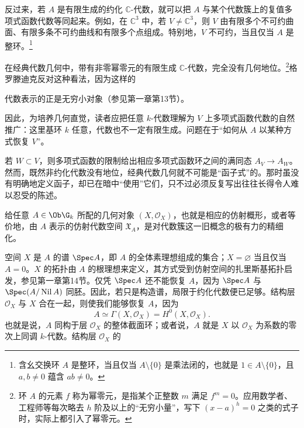 反过来，若 $A$ 是有限生成的约化 $\mathbb C$-代数，就可以把 $A$ 与某个代数簇上的复值多项式函数代数等同起来。例如，在 $\mathbb C^3$ 中，若 $V\ne\mathbb C^3$，则 $V$ 由有限多个不可约曲面、有限多条不可约曲线和有限多个点组成。特别地，$V$ 不可约，当且仅当 $A$ 是整环。\footnote{含幺交换环 $A$ 是整环，当且仅当 $A\setminus\{0\}$ 是乘法闭的，也就是 $1\in A\setminus\{0\}$，且 $a,b\ne0$ 蕴含 $ab\ne0$。}
\begin{center}
\end{center}
在经典代数几何中，带有非零幂零元的有限生成 $\mathbb C$-代数，完全没有几何地位。\footnote{环 $A$ 的元素 $f$ 称为幂零元，是指某个正整数 $m$ 满足 $f^m=0$。应用数学者、工程师等每次略去 $h$ 阶及以上的“无穷小量”，写下 $(x-a)^h=0$ 之类的式子时，实际上都引入了幂零元。}格罗滕迪克反对这种看法，因为这样的

代数表示的正是无穷小对象（参见第一章第13节）。

因此，为培养几何直觉，读者应把任意 $k$-代数理解为 $V$ 上多项式函数代数的自然推广：这里基环 $k$ 任意，代数也不一定有限生成。问题在于“如何从 $A$ 以某种方式恢复 $V$”。

若 $W\subset V$，则多项式函数的限制给出相应多项式函数环之间的满同态 $A_V\to A_W$。然而，既然非约化代数没有地位，经典代数几何就不可能是“函子式”的。那时虽没有明确地定义函子，却已在暗中“使用”它们，只不过必须反复写出往往长得令人难以忍受的陈述。

给任意 $A\in\Ob\G_k$ 所配的几何对象 $(X,\mathcal O_X)$，也就是相应的仿射概形，或者等价地，由 $A$ 表示的仿射代数空间 $\mathfrak X_A$，是对代数簇这一旧概念的极有力的精细化。

空间 $X$ 是 $A$ 的谱 $\Spec A$，即 $A$ 的全体素理想组成的集合；$X=\varnothing$ 当且仅当 $A=0$。$X$ 的拓扑由 $A$ 的根理想来定义，其方式受到仿射空间的扎里斯基拓扑启发，参见第一章第14节。仅凭 $\Spec A$ 还不能恢复 $A$，因为 $\Spec A$ 与 $\Spec(A/\operatorname{Nil}A)$ 同胚。因此，若只是构造谱，局限于约化代数便已足够。结构层 $\mathcal O_X$ 与 $X$ 合在一起，则使我们能够恢复 $A$，因为
\[
A\simeq\Gamma(X,\mathcal O_X)=H^0(X,\mathcal O_X).
\]
也就是说，$A$ 同构于层 $\mathcal O_X$ 的整体截面环；或者说，$A$ 就是 $X$ 以 $\mathcal O_X$ 为系数的零次上同调 $k$-代数。结构层 $\mathcal O_X$ 的

